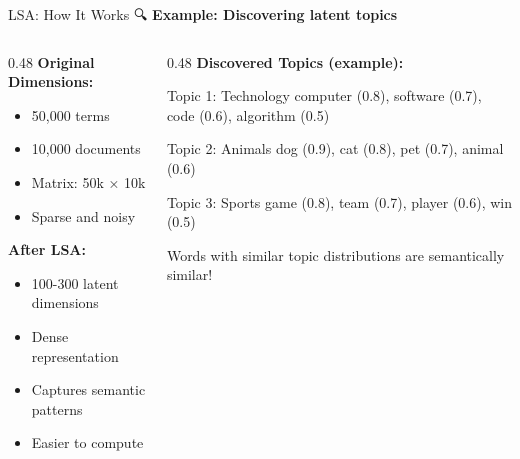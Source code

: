 \documentclass[aspectratio=169]{beamer}
\begin{document}
\begin{frame}[shrink=10]{LSA: How It Works 🔍}
\textbf{Example: Discovering latent topics}

\vspace{1em}

\begin{columns}[T]
\begin{column}{0.48\textwidth}
\textbf{Original Dimensions:}
\begin{itemize}\setlength{\itemsep}{0pt}
    \item 50,000 terms
    \item 10,000 documents
    \item Matrix: 50k × 10k
    \item Sparse and noisy
\end{itemize}

\vspace{1em}
\textbf{After LSA:}
\begin{itemize}\setlength{\itemsep}{0pt}
    \item 100-300 latent dimensions
    \item Dense representation
    \item Captures semantic patterns
    \item Easier to compute
\end{itemize}
\end{column}

\begin{column}{0.48\textwidth}
\textbf{Discovered Topics (example):}

\vspace{0.5em}
\begin{block}{Topic 1: Technology}
computer (0.8), software (0.7), code (0.6), algorithm (0.5)
\end{block}

\begin{block}{Topic 2: Animals}
dog (0.9), cat (0.8), pet (0.7), animal (0.6)
\end{block}

\begin{block}{Topic 3: Sports}
game (0.8), team (0.7), player (0.6), win (0.5)
\end{block}

\vspace{0.5em}
\small
Words with similar topic distributions are semantically similar!
\end{column}
\end{columns}
\end{frame}
\end{document}
